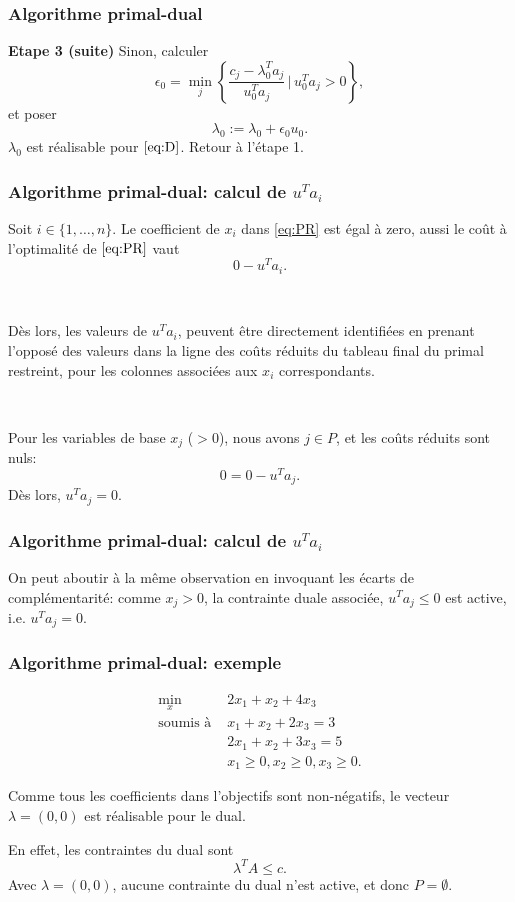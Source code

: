 \documentclass[t,usepdftitle=false]{beamer}
\begin{document}
\begin{frame}
\frametitle{Algorithme primal-dual}

{\bf Etape 3 (suite)}
Sinon, calculer
$$
\epsilon_0 = \min_j \left\lbrace \frac{c_j - \lambda_0^Ta_j}{u_0^T a_j} \,\bigg|\, u_0^Ta_j > 0\right\rbrace,
$$
et poser
\[
\lambda_0 := \lambda_0 + \epsilon_0 u_0.
\]
$\lambda_0$ est réalisable pour $\eqref{eq:D}$.
Retour à l'étape 1.

\end{frame}

\begin{frame}
	\frametitle{Algorithme primal-dual: calcul de $u^Ta_i$}
	
	Soit $i \in \{1,\ldots,n\}$.
	Le coefficient de $x_i$ dans \eqref{eq:PR} est égal à zero, aussi le coût à l'optimalité de $\eqref{eq:PR}$ vaut
	$$
	0 - u^Ta_i.
	$$
	
	\ 
	
	Dès lors, les valeurs de $u^Ta_i$, peuvent être directement identifiées en prenant l'opposé des valeurs dans la ligne des coûts réduits du tableau final du primal restreint, pour les colonnes associées aux $x_i$ correspondants.
	
	\
	
	Pour les variables de base $x_j$ ($> 0$), nous avons $j \in P$, et les coûts réduits sont nuls:
	$$
	0 = 0 - u^Ta_j.
	$$
	Dès lors, $u^T a_j = 0$.
	
\end{frame}

\begin{frame}
	\frametitle{Algorithme primal-dual: calcul de $u^Ta_i$}
	
	On peut aboutir à la même observation en invoquant les écarts de complémentarité: comme $x_j > 0$, la contrainte duale associée, $u^T a_j \leq 0$ est active, i.e. $u^T a_j = 0$.
	
\end{frame}

\begin{frame}
\frametitle{Algorithme primal-dual: exemple}

\begin{align*}
\min_x \ & 2x_1 + x_2 + 4x_3 \\
\mbox{soumis à } & x_1 + x_2 + 2x_3 = 3 \\
& 2x_1 + x_2 + 3x_3 = 5 \\
& x_1 \geq 0, x_2 \geq 0, x_3 \geq 0.
\end{align*}

\mbox{}

Comme tous les coefficients dans l'objectifs sont non-négatifs, le vecteur $\lambda = (0,0)$ est réalisable pour le dual.

\mbox{}

En effet, les contraintes du dual sont
\[
\lambda^T A \leq c.
\]
Avec $\lambda = (0,0)$, aucune contrainte du dual n'est active, et donc $P = \emptyset$.

\end{frame}
\end{document}
